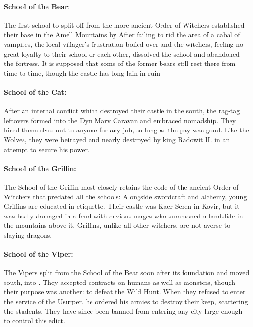 \documentclass[parskip=full,11pt]{scrreport}
\begin{document}
\paragraph{School of the Bear:}
The first school to split off from the more ancient Order of Witchers established their base in the Amell Mountains by 
After failing to rid the area of a cabal of vampires, the local villager's frustration boiled over and the witchers,
feeling no great loyalty to their school or each other, dissolved the school and abandoned the fortress. It is supposed
that some of the former bears still rest there from time to time, though the castle has long lain in ruin.

\paragraph{School of the Cat:}
After an internal conflict which destroyed their castle in the south, the rag-tag leftovers formed into the Dyn Marv Caravan and embraced nomadship.
They hired themselves out to anyone for any job, so long as the pay was good. Like the Wolves, they were betrayed and nearly
destroyed by king Radowit II. in an attempt to secure his power.

\paragraph{School of the Griffin:}
The School of the Griffin most closely retains the code of the ancient Order of Witchers that predated all the schools:
Alongside swordcraft and alchemy, young Griffins are educated in etiquette. Their castle was Kaer Seren in Kovir, but it was
badly damaged in a feud with envious mages who summoned a landslide in the mountains above it. Griffins, unlike all other
witchers, are not averse to slaying dragons.

\paragraph{School of the Viper:}
The Vipers split from the School of the Bear soon after its foundation and moved south, into .
They accepted contracts on humans as well as monsters, though their purpose was another: to defeat the Wild Hunt.
When they refused to enter the service of the Usurper, he ordered his armies to destroy their keep, scattering the students.
They have since been banned from entering any city large enough to control this edict.
\end{document}
